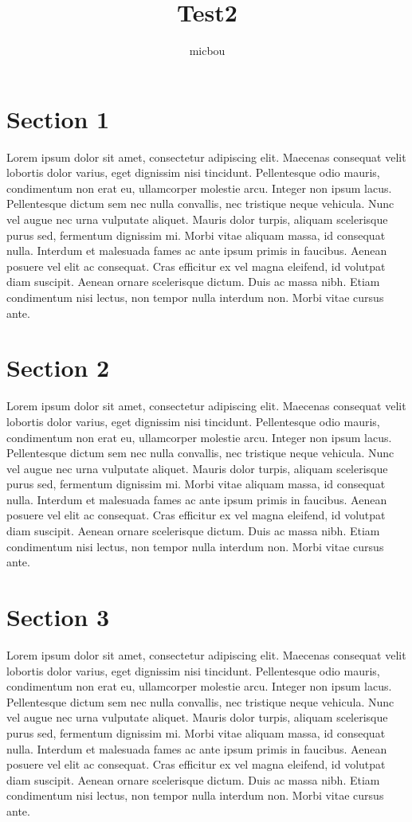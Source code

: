 \documentclass{article}
\title{Test2}
\author{micbou}
\begin{document}
\maketitle

\section{Section 1}

Lorem ipsum dolor sit amet, consectetur adipiscing elit. Maecenas consequat velit lobortis dolor varius, eget dignissim nisi tincidunt. Pellentesque odio mauris, condimentum non erat eu, ullamcorper molestie arcu. Integer non ipsum lacus. Pellentesque dictum sem nec nulla convallis, nec tristique neque vehicula. Nunc vel augue nec urna vulputate aliquet. Mauris dolor turpis, aliquam scelerisque purus sed, fermentum dignissim mi. Morbi vitae aliquam massa, id consequat nulla. Interdum et malesuada fames ac ante ipsum primis in faucibus. Aenean posuere vel elit ac consequat. Cras efficitur ex vel magna eleifend, id volutpat diam suscipit. Aenean ornare scelerisque dictum. Duis ac massa nibh. Etiam condimentum nisi lectus, non tempor nulla interdum non. Morbi vitae cursus ante.

\section{Section 2}

Lorem ipsum dolor sit amet, consectetur adipiscing elit. Maecenas consequat velit lobortis dolor varius, eget dignissim nisi tincidunt. Pellentesque odio mauris, condimentum non erat eu, ullamcorper molestie arcu. Integer non ipsum lacus. Pellentesque dictum sem nec nulla convallis, nec tristique neque vehicula. Nunc vel augue nec urna vulputate aliquet. Mauris dolor turpis, aliquam scelerisque purus sed, fermentum dignissim mi. Morbi vitae aliquam massa, id consequat nulla. Interdum et malesuada fames ac ante ipsum primis in faucibus. Aenean posuere vel elit ac consequat. Cras efficitur ex vel magna eleifend, id volutpat diam suscipit. Aenean ornare scelerisque dictum. Duis ac massa nibh. Etiam condimentum nisi lectus, non tempor nulla interdum non. Morbi vitae cursus ante.

\section{Section 3}

Lorem ipsum dolor sit amet, consectetur adipiscing elit. Maecenas consequat velit lobortis dolor varius, eget dignissim nisi tincidunt. Pellentesque odio mauris, condimentum non erat eu, ullamcorper molestie arcu. Integer non ipsum lacus. Pellentesque dictum sem nec nulla convallis, nec tristique neque vehicula. Nunc vel augue nec urna vulputate aliquet. Mauris dolor turpis, aliquam scelerisque purus sed, fermentum dignissim mi. Morbi vitae aliquam massa, id consequat nulla. Interdum et malesuada fames ac ante ipsum primis in faucibus. Aenean posuere vel elit ac consequat. Cras efficitur ex vel magna eleifend, id volutpat diam suscipit. Aenean ornare scelerisque dictum. Duis ac massa nibh. Etiam condimentum nisi lectus, non tempor nulla interdum non. Morbi vitae cursus ante.
\end{document}
